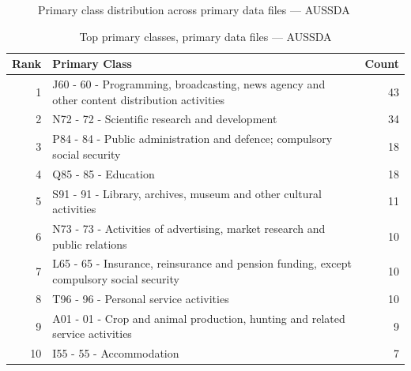 \clearpage

\begin{figure}[H]
    \centering
    
    \caption{Primary class distribution across primary data files --- AUSSDA}
\end{figure}

\begin{table}[H]
    \centering
    \begin{tabular}{r p{10cm} r}
    \hline
    \textbf{Rank} & \textbf{Primary Class} & \textbf{Count} \\
    \hline
    1 & J60 - 60 - Programming, broadcasting, news agency and other content distribution activities & 43 \\
    2 & N72 - 72 - Scientific research and development & 34 \\
    3 & P84 - 84 - Public administration and defence; compulsory social security & 18 \\
    4 & Q85 - 85 - Education & 18 \\
    5 & S91 - 91 - Library, archives, museum and other cultural activities & 11 \\
    6 & N73 - 73 - Activities of advertising, market research and public relations & 10 \\
    7 & L65 - 65 - Insurance, reinsurance and pension funding, except compulsory social security & 10 \\
    8 & T96 - 96 - Personal service activities & 10 \\
    9 & A01 - 01 - Crop and animal production, hunting and related service activities & 9 \\
    10 & I55 - 55 - Accommodation & 7 \\
    \hline
    \end{tabular}
    \caption{Top primary classes, primary data files --- AUSSDA}
\end{table}
